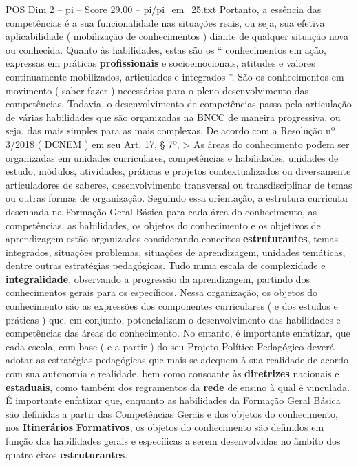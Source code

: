 \begin{textsample}{POS Dim 2 – pi – Score 29.00 – pi/pi\_em\_25.txt}
Portanto, a essência das competências é a sua funcionalidade nas situações reais, ou seja, sua efetiva aplicabilidade ( mobilização de conhecimentos ) diante de qualquer situação nova ou conhecida.
Quanto às habilidades, estas são os “ conhecimentos em ação, expressas em práticas \textbf{profissionais} e socioemocionais, atitudes e valores continuamente mobilizados, articulados e integrados ”.
São os conhecimentos em movimento ( saber fazer ) necessários para o pleno desenvolvimento das competências.
Todavia, o desenvolvimento de competências passa pela articulação de várias habilidades que são organizadas na BNCC de maneira progressiva, ou seja, das mais simples para as mais complexas.
De acordo com a Resolução nº 3/2018 ( DCNEM ) em seu Art. 17, § 7º, > As áreas do conhecimento podem ser organizadas em unidades curriculares, competências e habilidades, unidades de estudo, módulos, atividades, práticas e projetos contextualizados ou diversamente articuladores de saberes, desenvolvimento transversal ou transdisciplinar de temas ou outras formas de organização.
Seguindo essa orientação, a estrutura curricular desenhada na Formação Geral Básica para cada área do conhecimento, as competências, as habilidades, os objetos do conhecimento e os objetivos de aprendizagem estão organizados considerando conceitos \textbf{estruturantes}, temas integrados, situações problemas, situações de aprendizagem, unidades temáticas, dentre outras estratégias pedagógicas.
Tudo numa escala de complexidade e \textbf{integralidade}, observando a progressão da aprendizagem, partindo dos conhecimentos gerais para os específicos.
Nessa organização, os objetos do conhecimento são as expressões dos componentes curriculares ( e dos estudos e práticas ) que, em conjunto, potencializam o desenvolvimento das habilidades e competências das áreas do conhecimento.
No entanto, é importante enfatizar, que cada escola, com base ( e a partir ) do seu Projeto Político Pedagógico deverá adotar as estratégias pedagógicas que mais se adequem à sua realidade de acordo com sua autonomia e realidade, bem como consoante às \textbf{diretrizes} nacionais e \textbf{estaduais}, como também dos regramentos da \textbf{rede} de ensino à qual é vinculada.
É importante enfatizar que, enquanto as habilidades da Formação Geral Básica são definidas a partir das Competências Gerais e dos objetos do conhecimento, nos \textbf{Itinerários} \textbf{Formativos}, os objetos do conhecimento são definidos em função das habilidades gerais e específicas a serem desenvolvidas no âmbito dos quatro eixos \textbf{estruturantes}.

\end{textsample}
